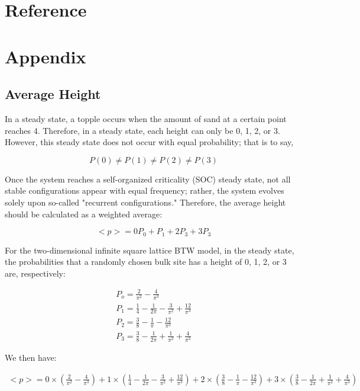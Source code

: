 \documentclass{article}
\begin{document}
\clearpage

\section{Reference}


\clearpage


\section{Appendix}
\subsection{Average Height}
In a steady state, a topple occurs when the amount of sand at a certain point reaches 4. Therefore, in a steady state, each height can only be 0, 1, 2, or 3. However, this steady state does not occur with equal probability; that is to say,

$$
P(0) \neq P(1) \neq P(2) \neq P(3)
$$

Once the system reaches a self-organized criticality (SOC) steady state, not all stable configurations appear with equal frequency; rather, the system evolves solely upon so-called "recurrent configurations." Therefore, the average height should be calculated as a weighted average:

$$
<p> = 0 P_0 +P_1+2P_3+3P_3
$$

For the two-dimensional infinite square lattice BTW model, in the steady state, the probabilities that a randomly chosen bulk site has a height of 0, 1, 2, or 3 are, respectively:

\begin{align}
    P_o = \frac{2}{\pi^2} - \frac{4}{\pi^3}\\
    P_1 = \frac{1}{4} - \frac{1}{2\pi}-\frac{3}{\pi^2}+\frac{12}{\pi^3}\\
    P_2 = \frac{3}{8}-\frac{1}{\pi}-\frac{12}{\pi^3}\\
    P_3 = \frac{3}{8}-\frac{1}{2\pi}+\frac{1}{\pi^2}+\frac{4}{\pi^3}
\end{align}

We then have:

\begin{align}
    <p> = 0 \times (\frac{2}{\pi^2} - \frac{4}{\pi^3}) + 1 \times (\frac{1}{4} - \frac{1}{2\pi}-\frac{3}{\pi^2}+\frac{12}
    {\pi^3})+2 \times (\frac{3}{8}-\frac{1}{\pi}-\frac{12}{\pi^3}) +3 \times (\frac{3}{8}-\frac{1}{2\pi}+\frac{1}{\pi^2}+\frac{4}{\pi^3})
\end{align}
\end{document}
